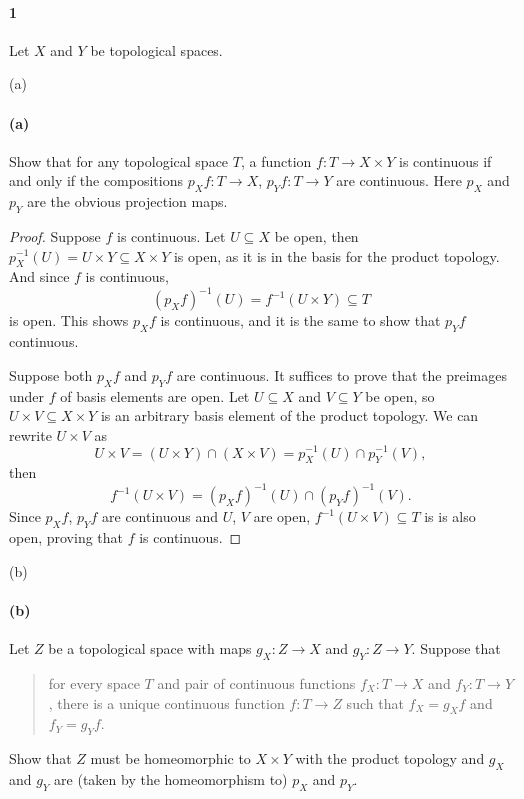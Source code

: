 \documentclass[12pt]{article}
\newlength{\myparskip}
\newenvironment{fullbox}{\begin{lrbox}{\savefullbox}\begin{minipage}{\dimexpr\textwidth-2\fboxsep\relax}\setlength{\parskip}{\myparskip}}{\end{minipage}\end{lrbox}\framebox[\textwidth]{\usebox{\savefullbox}}}
\newenvironment{pbox}[1][]{\begin{fullbox}\ifx#1\empty\else\paragraph{#1}\fi}{\end{fullbox}}
\theoremstyle{definition}
\newcommand{\<}{\langle}
\renewcommand{\>}{\rangle}
\begin{document}
\thispagestyle{title}

\begin{pbox}[1]
    Let $X$ and $Y$ be topological spaces.
\end{pbox}

\begin{pbox}[(a)]
    Show that for any topological space $T$, a function
    $f: T \to X \times Y$ is continuous if and only if the compositions
    $p_X f: T \to X$, $p_Y f: T \to Y$ are continuous.  Here $p_X$ and $p_Y$ are
    the obvious projection maps.
\end{pbox}

\begin{proof}
    Suppose $f$ is continuous. Let $U \subseteq X$ be open, then $p_X^{-1}(U) = U \times Y \subseteq X \times Y$ is open, as it is in the basis for the product topology. And since $f$ is continuous, 
    \[
        (p_Xf)^{-1}(U) = f^{-1}(U \times Y) \subseteq T
    \]
    is open. This shows $p_Xf$ is continuous, and it is the same to show that $p_Yf$ continuous.

    Suppose both $p_Xf$ and $p_Yf$ are continuous. It suffices to prove that the preimages under $f$ of basis elements are open. Let $U \subseteq X$ and $V \subseteq Y$ be open, so $U \times V \subseteq X \times Y$ is an arbitrary basis element of the product topology. We can rewrite $U \times V$ as
    \[
        U \times V = (U \times Y) \cap (X \times V) = p_X^{-1}(U) \cap p_Y^{-1}(V),
    \]
    then
    \[
        f^{-1}(U \times V) = (p_Xf)^{-1}(U) \cap (p_Yf)^{-1}(V).
    \]
    Since $p_Xf$, $p_Yf$ are continuous and $U$, $V$ are open, $f^{-1}(U \times V) \subseteq T$ is is also open, proving that $f$ is continuous.

\end{proof}

\newpage
\begin{pbox}[(b)]
    Let $Z$ be a topological space with maps $g_X:Z \to X$ and
    $g_Y:Z \to Y$.  Suppose that
    \begin{quote}
        for every space $T$ and pair of continuous functions $f_X:T \to X$ and
        $f_Y:T \to Y$, there is a unique continuous function $f:T \to Z$ such that
        $f_X=g_Xf$ and $f_Y=g_Yf$.
    \end{quote}
    Show that $Z$ must be homeomorphic to $X \times Y$ with the product topology
    and $g_X$ and $g_Y$ are (taken by the homeomorphism to) $p_X$ and $p_Y$.
\end{pbox}
\end{document}
